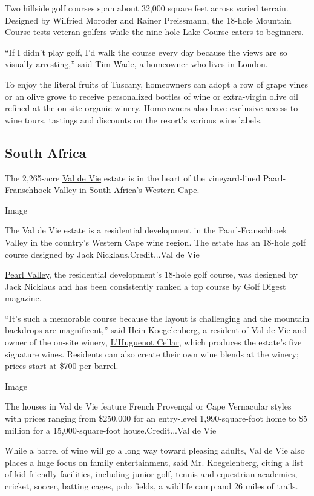 Two hillside golf courses span about 32,000 square feet across varied
terrain. Designed by Wilfried Moroder and Rainer Preissmann, the 18-hole
Mountain Course tests veteran golfers while the nine-hole Lake Course
caters to beginners.

``If I didn't play golf, I'd walk the course every day because the views
are so visually arresting,'' said Tim Wade, a homeowner who lives in
London.

To enjoy the literal fruits of Tuscany, homeowners can adopt a row of
grape vines or an olive grove to receive personalized bottles of wine or
extra-virgin olive oil refined at the on-site organic winery. Homeowners
also have exclusive access to wine tours, tastings and discounts on the
resort's various wine labels.

\hypertarget{south-africa}{%
\subsection{South Africa}\label{south-africa}}

The 2,265-acre \href{https://valdevie.co.za/}{Val de Vie} estate is in
the heart of the vineyard-lined Paarl-Franschhoek Valley in South
Africa's Western Cape.

Image

The Val de Vie estate is a residential development in the
Paarl-Franschhoek Valley in the country's Western Cape wine region. The
estate has an 18-hole golf course designed by Jack Nicklaus.Credit...Val
de Vie

\href{https://www.pearlvalley.co.za/}{Pearl Valley}, the residential
development's 18-hole golf course, was designed by Jack Nicklaus and has
been consistently ranked a top course by Golf Digest magazine.

``It's such a memorable course because the layout is challenging and the
mountain backdrops are magnificent,'' said Hein Koegelenberg, a resident
of Val de Vie and owner of the on-site winery,
\href{https://valdevie.co.za/wine/cellar/}{L'Huguenot Cellar}, which
produces the estate's five signature wines. Residents can also create
their own wine blends at the winery; prices start at \$700 per barrel.

Image

The houses in Val de Vie feature French Provençal or Cape Vernacular
styles with prices ranging from \$250,000 for an entry-level
1,990-square-foot home to \$5 million for a 15,000-square-foot
house.Credit...Val de Vie

While a barrel of wine will go a long way toward pleasing adults, Val de
Vie also places a huge focus on family entertainment, said Mr.
Koegelenberg, citing a list of kid-friendly facilities, including junior
golf, tennis and equestrian academies, cricket, soccer, batting cages,
polo fields, a wildlife camp and 26 miles of trails.

